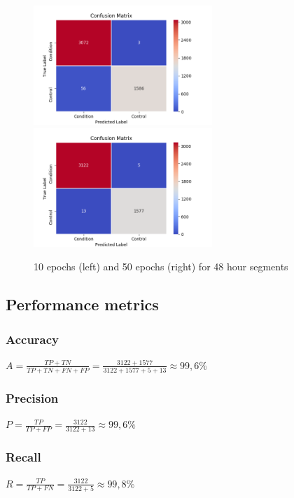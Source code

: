 \begin{figure}
      \begin{multicols}{2}
            \includegraphics[height=4.5cm]{img/control_condition/conf_2880_60_10_32.png}
            \includegraphics[height=4.5cm]{img/control_condition/conf_2880_60_50_32.png}
      \end{multicols}
      \caption{10 epochs (left) and 50 epochs (right) for 48 hour segments}
      \label{figure:control_condition_confusion_matrix_48h}
\end{figure}



\subsection{Performance metrics}

\subsubsection{Accuracy}
$ A = \frac{TP+TN}{TP+TN+FN+FP} = \frac{3122+1577}{3122+1577+5+13} \approx 99,6\%$

\subsubsection{Precision}
$ P = \frac{TP}{TP+FP} = \frac{3122}{3122+13} \approx 99,6\%$

\subsubsection{Recall}
$ R = \frac{TP}{TP+FN} = \frac{3122}{3122+5} \approx 99,8\%$

